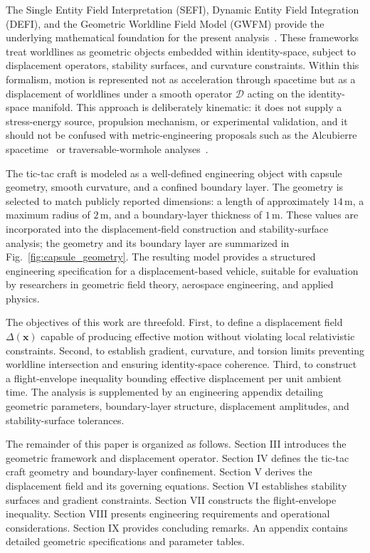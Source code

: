 \documentclass[aip,adv,reprint,floatfix]{revtex4-2}
\begin{document}
The Single Entity Field Interpretation (SEFI), Dynamic Entity Field Integration (DEFI), and the Geometric Worldline Field Model (GWFM) provide the underlying mathematical foundation for the present analysis~\cite{DuttonSEFI2026,DuttonGWFM2026,DuttonUnified2026}. These frameworks treat worldlines as geometric objects embedded within identity-space, subject to displacement operators, stability surfaces, and curvature constraints. Within this formalism, motion is represented not as acceleration through spacetime but as a displacement of worldlines under a smooth operator $\mathcal{D}$ acting on the identity-space manifold. This approach is deliberately kinematic: it does not supply a stress-energy source, propulsion mechanism, or experimental validation, and it should not be confused with metric-engineering proposals such as the Alcubierre spacetime~\cite{Alcubierre1994} or traversable-wormhole analyses~\cite{MorrisThorne1988}.

The tic-tac craft is modeled as a well-defined engineering object with capsule geometry, smooth curvature, and a confined boundary layer. The geometry is selected to match publicly reported dimensions: a length of approximately $14\,\mathrm{m}$, a maximum radius of $2\,\mathrm{m}$, and a boundary-layer thickness of $1\,\mathrm{m}$. These values are incorporated into the displacement-field construction and stability-surface analysis; the geometry and its boundary layer are summarized in Fig.~\ref{fig:capsule_geometry}. The resulting model provides a structured engineering specification for a displacement-based vehicle, suitable for evaluation by researchers in geometric field theory, aerospace engineering, and applied physics.

The objectives of this work are threefold. First, to define a displacement field $\Delta(\mathbf{x})$ capable of producing effective motion without violating local relativistic constraints. Second, to establish gradient, curvature, and torsion limits preventing worldline intersection and ensuring identity-space coherence. Third, to construct a flight-envelope inequality bounding effective displacement per unit ambient time. The analysis is supplemented by an engineering appendix detailing geometric parameters, boundary-layer structure, displacement amplitudes, and stability-surface tolerances.

The remainder of this paper is organized as follows. Section III introduces the geometric framework and displacement operator. Section IV defines the tic-tac craft geometry and boundary-layer confinement. Section V derives the displacement field and its governing equations. Section VI establishes stability surfaces and gradient constraints. Section VII constructs the flight-envelope inequality. Section VIII presents engineering requirements and operational considerations. Section IX provides concluding remarks. An appendix contains detailed geometric specifications and parameter tables.
\end{document}
